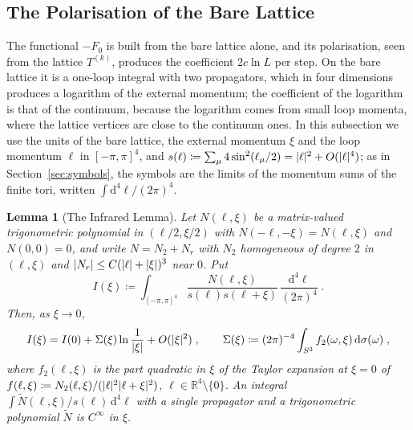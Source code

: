 \documentclass[11pt]{preprint}
\newcommand{\dd}{\mathrm{d}}
\DeclarePairedDelimiter{\abs}{\lvert}{\rvert}
\numberwithin{equation}{section}
\newtheorem{lemma}{Lemma}[section]
\theoremstyle{definition}
\theoremstyle{remark}
\theoremstyle{plain}
\begin{document}
\subsection{The Polarisation of the Bare Lattice}\label{sec:bare-polarisation}

The functional $-F_0$ is built from the bare lattice alone, and its polarisation, seen from the lattice $T^{(k)}$, produces the coefficient $2c\ln L$ per step. On the bare lattice it is a one-loop integral with two propagators, which in four dimensions produces a logarithm of the external momentum; the coefficient of the logarithm is that of the continuum, because the logarithm comes from small loop momenta, where the lattice vertices are close to the continuum ones. In this subsection we use the units of the bare lattice, the external momentum $\xi$ and the loop momentum $\ell$ in $[-\pi, \pi]^4$, and $s(\ell) \coloneqq \sum_\mu4\sin^2(\ell_\mu/2) = \abs{\ell}^2 + O(\abs{\ell}^4)$; as in Section~\ref{sec:symbols}, the symbols are the limits of the momentum sums of the finite tori, written $\int\dd^4\ell/(2\pi)^4$.

\begin{lemma}[The Infrared Lemma]\label{lem:infrared}
Let $N(\ell, \xi)$ be a matrix-valued trigonometric polynomial in $(\ell/2, \xi/2)$ with $N(-\ell, -\xi) = N(\ell, \xi)$ and $N(0, 0) = 0$, and write $N = N_2 + N_r$ with $N_2$ homogeneous of degree $2$ in $(\ell, \xi)$ and $\abs{N_r} \leq C(\abs{\ell} + \abs{\xi})^3$ near $0$. Put
\begin{equation}\label{eq:bubble-integral}
    I(\xi) \coloneqq \int_{[-\pi,\pi]^4}\frac{N(\ell, \xi)}{s(\ell)s(\ell + \xi)}\,\frac{\dd^4\ell}{(2\pi)^4}\;.
\end{equation}
Then, as $\xi \to 0$,
\begin{equation}\label{eq:infrared-expansion}
    I(\xi) = I(0) + \Sigma(\xi)\ln\frac{1}{\abs{\xi}} + O(\abs{\xi}^2)\;,
    \qquad
    \Sigma(\xi) \coloneqq (2\pi)^{-4}\int_{S^3}f_2(\omega, \xi)\,\dd\sigma(\omega)\;,
\end{equation}
where $f_2(\ell, \xi)$ is the part quadratic in $\xi$ of the Taylor expansion at $\xi = 0$ of $f(\ell, \xi) \coloneqq N_2(\ell, \xi)/(\abs{\ell}^2\abs{\ell + \xi}^2)$, $\ell \in \mathbb R^4 \setminus \{ 0 \}$. An integral $\int\tilde N(\ell, \xi)/s(\ell)\,\dd^4\ell$ with a single propagator and a trigonometric polynomial $\tilde N$ is $C^\infty$ in $\xi$.
\end{lemma}
\end{document}
